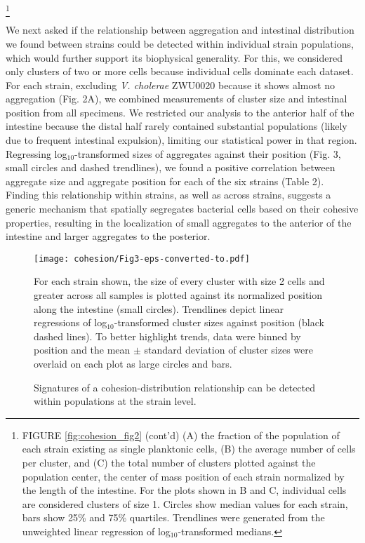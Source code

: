 {\let\thefootnote\relax\footnote{FIGURE \ref{fig:cohesion_fig2} (cont'd) (A) the fraction of the population of each strain existing as single planktonic cells, (B) the average number of cells per cluster, and (C) the total number of clusters plotted against the population center, the center of mass position of each strain normalized by the length of the intestine. For the plots shown in B and C, individual cells are considered clusters of size 1. Circles show median values for each strain, bars show 25\% and 75\% quartiles. Trendlines were generated from the unweighted linear regression of log$_{10}$-transformed medians.}

We next asked if the relationship between aggregation and intestinal distribution we found between strains could be detected within individual strain populations, which would further support its biophysical generality. For this, we considered only clusters of two or more cells because individual cells dominate each dataset. For each strain, excluding \textit{V. cholerae} ZWU0020 because it shows almost no aggregation (Fig. 2A), we combined measurements of cluster size and intestinal position from all specimens. We restricted our analysis to the anterior half of the intestine because the distal half rarely contained substantial populations (likely due to frequent intestinal expulsion), limiting our statistical power in that region. Regressing log$_{10}$-transformed sizes of aggregates against their position (Fig. 3, small circles and dashed trendlines), we found a positive correlation between aggregate size and aggregate position for each of the six strains (Table 2). Finding this relationship within strains, as well as across strains, suggests a generic mechanism that spatially segregates bacterial cells based on their cohesive properties, resulting in the localization of small aggregates to the anterior of the intestine and larger aggregates to the posterior.


\begin{figure}%
	\centerline{
		\texttt{[image: cohesion/Fig3-eps-converted-to.pdf]}}
	\caption{Signatures of a cohesion-distribution relationship can be detected within populations at the strain level.} { For each strain shown, the size of every cluster with size 2 cells and greater across all samples is plotted against its normalized position along the intestine (small circles). Trendlines depict linear regressions of log$_{10}$-transformed cluster sizes against position (black dashed lines). To better highlight trends, data were binned by position and the mean $\pm$ standard deviation of cluster sizes were overlaid on each plot as large circles and bars. }
\end{figure}
	
}
